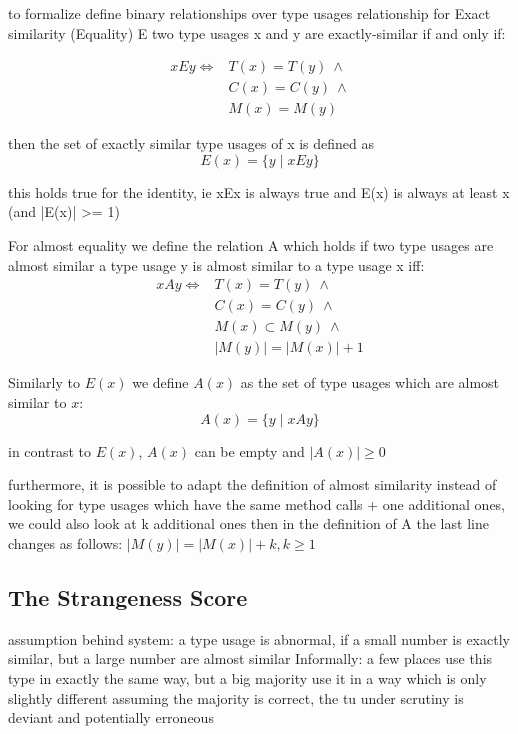 to formalize define binary relationships over type usages
relationship for Exact similarity (Equality) E
two type usages x and y are exactly-similar if and only if:

\begin{align*}
xEy \iff & T(x) = T(y) \: \land \\
         & C(x) = C(y) \: \land \\
         & M(x) = M(y)
\end{align*}

then the set of exactly similar type usages of x is defined as
\begin{equation*}
E(x) = \{y \mid xEy \}
\end{equation*}

this holds true for the identity, ie xEx is always true and E(x) is always at least {x} (and |E(x)| >= 1)

For almost equality we define the relation A which holds if two type usages are almost similar
a type usage y is almost similar to a type usage x iff:
\begin{align*}
xAy \iff & T(x) = T(y) \: \land \\
         & C(x) = C(y) \: \land \\
         & M(x) \subset M(y) \: \land \\
         & |M(y)| = |M(x)| + 1
\end{align*}

Similarly to $E(x)$ we define $A(x)$ as the set of type usages which are almost similar to $x$:
\begin{equation*}
A(x) = \{y \mid xAy \}
\end{equation*}

in contrast to $E(x)$, $A(x)$ can be empty and $|A(x)|\geq0$

furthermore, it is possible to adapt the definition of almost similarity
instead of looking for type usages which have the same method calls + one additional ones, we could also look at k additional ones
then in the definition of A the last line changes as follows: $|M(y)| = |M(x)| + k, k\geq1$

\subsection{The Strangeness Score}

assumption behind system:
a type usage is abnormal, if a small number is exactly similar, but a large number are almost similar
Informally: a few places use this type in exactly the same way, but a big majority use it in a way which is only slightly different
assuming the majority is correct, the tu under scrutiny is deviant and potentially erroneous

